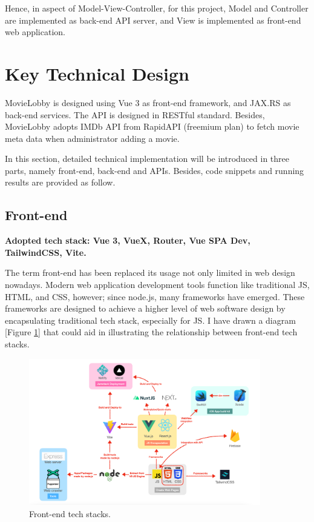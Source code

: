 \documentclass{article}
\begin{document}
Hence, in aspect of Model-View-Controller, for this project, Model and Controller are implemented as back-end API server, and View is implemented as front-end web application. 

\newpage
\section{Key Technical Design}

MovieLobby is designed using Vue 3 as front-end framework, and JAX.RS as back-end services. The API is designed in RESTful standard. Besides, MovieLobby adopts IMDb API from RapidAPI (freemium plan) to fetch movie meta data when administrator adding a movie.

In this section, detailed technical implementation will be introduced in three parts, namely front-end, back-end and APIs. Besides, code snippets and running results are provided as follow.

\subsection{Front-end}

\textbf{Adopted tech stack: Vue 3, VueX, Router, Vue SPA Dev, TailwindCSS, Vite.}
\newline

The term front-end has been replaced its usage not only limited in web design nowadays. Modern web application development tools function like traditional JS, HTML, and CSS, however; since node.js, many frameworks have emerged. These frameworks are designed to achieve a higher level of web software design by encapsulating traditional tech stack, especially for JS. I have drawn a diagram [Figure \ref{fig:techs}] that could aid in illustrating the relationship between front-end tech stacks. \cite{aspires}

\begin{figure}[!htp]
\centering
\includegraphics[width=0.9\textwidth]{techs-1.png}
\caption{\label{fig:techs}Front-end tech stacks.}
\end{figure}
\end{document}
